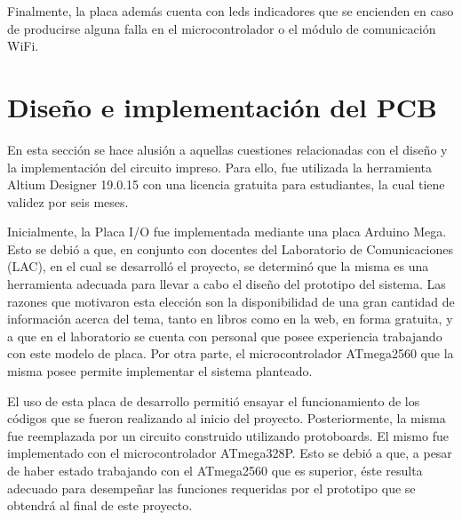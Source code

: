 Finalmente, la placa además cuenta con leds indicadores que se encienden en caso de producirse alguna falla en el microcontrolador o el módulo de comunicación WiFi.


\section{Diseño e implementación del PCB }

En esta sección se hace alusión a aquellas cuestiones relacionadas con el diseño y la implementación del circuito impreso. Para ello, fue utilizada la herramienta Altium Designer 19.0.15 con una licencia gratuita para estudiantes, la cual tiene validez por seis meses. 

Inicialmente, la Placa I/O fue implementada mediante una placa Arduino Mega. Esto se debió a que, en conjunto con docentes del Laboratorio de Comunicaciones (LAC), en el cual se desarrolló el proyecto, se determinó que la misma es una herramienta adecuada para llevar a cabo el diseño del prototipo del sistema. Las razones que motivaron esta elección son la disponibilidad de una gran cantidad de información acerca del tema, tanto en libros como en la web, en forma gratuita, y a que en el laboratorio se cuenta con personal que posee experiencia trabajando con este modelo de placa. Por otra parte, el microcontrolador ATmega2560 que la misma posee permite implementar el sistema planteado.


El uso de esta placa de desarrollo permitió ensayar el funcionamiento de los códigos que se fueron realizando al inicio del proyecto. Posteriormente, la misma fue reemplazada por un circuito construido utilizando protoboards. El mismo fue implementado con el microcontrolador ATmega328P. Esto se debió a que, a pesar de haber estado trabajando con el ATmega2560 que es superior, éste resulta adecuado para desempeñar las funciones requeridas por el prototipo que se obtendrá al final de este proyecto.  

